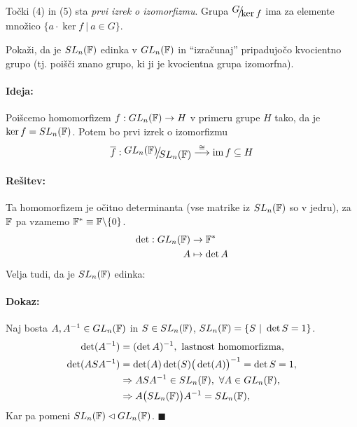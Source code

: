 \ni To\v cki (4) in (5) sta \emph{prvi izrek o izomorfizmu}. Grupa $\quot{G}{\ker f}$ ima za elemente mno\v zico $\{a\cdot \ker f\ |\ a \in G\}$.

\begin{zgled}
	Poka\v zi, da je $SL_n (\mathbb{F})$ edinka v $GL_n (\mathbb{F})$ in "`izra\v cunaj"' pripadujo\v co kvocientno grupo (tj. poi\v s\v ci znano grupo, ki ji je kvocientna grupa izomorfna).

	\paragraph{Ideja:} Poi\v scemo homomorfizem $f : GL_n (\mathbb{F}) \to H$ v primeru grupe $H$ tako, da je $\ker f = SL_n (\mathbb{F})$. Potem bo prvi izrek o izomorfizmu
	\[
		\f : \quot{GL_n(\F)}{SL_n(\F)} \stackrel{\cong}{\longrightarrow} \im f \subseteq H
	\]

	\paragraph{Re\v sitev:} Ta homomorfizem je o\v citno determinanta (vse matrike iz $SL_n(\mathbb{F})$ so v jedru), za $\mathbb{F}$ pa vzamemo $\mathbb{F}^* \equiv \mathbb{F}\backslash\{0\}$.
	\begin{align*}
		\det : GL_n (\mathbb{F}) &\to \mathbb{F}^* \\
		A &\mapsto \det A
	\end{align*}
	Velja tudi, da je $SL_n (\mathbb{F})$ edinka:
	\paragraph{Dokaz:}
	Naj bosta $A, A^{-1} \in GL_n (\mathbb{F})$ in $S \in SL_n(\mathbb{F})$, $SL_n(\mathbb{F}) = \{S\ |\ \det S = 1\}$.
	\begin{align*}
		\det (A^{-1}) &= (\det A)^{-1},\ \text{lastnost homomorfizma},\ \\
		\det (A S A^{-1}) &= \det(A) \det(S) \big(\det (A)\big)^{-1} = \det S = 1, \\
		&\Rightarrow A S A^{-1} \in SL_n (\mathbb{F}),\ \forall A \in GL_n (\mathbb{F}), \\
		&\Rightarrow A \big(SL_n (\mathbb{F})\big) A^{-1} = SL_n (\mathbb{F}),
	\end{align*}
	Kar pa pomeni $SL_n (\mathbb{F}) \lhd GL_n (\mathbb{F})$. $\blacksquare$


\end{zgled}
